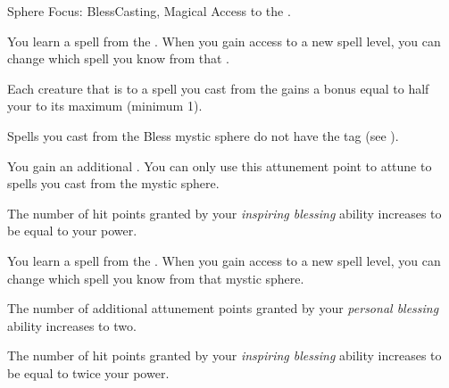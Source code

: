     \begin{feat}{Sphere Focus: Bless}{Casting, Magical}
        \featpre Access to the  .

         You learn a spell from the  .
        When you gain access to a new spell level, you can change which spell you know from that .

         Each creature that is  to a spell you cast from the   gains a bonus equal to half your  to its maximum  (minimum 1).

         Spells you cast from the Bless mystic sphere do not have the  tag (see ).

         You gain an additional .
        You can only use this attunement point to attune to spells you cast from the  mystic sphere.

         The number of hit points granted by your \textit{inspiring blessing} ability increases to be equal to your power.

         You learn a spell from the  .
        When you gain access to a new spell level, you can change which spell you know from that mystic sphere.

         The number of additional attunement points granted by your \textit{personal blessing} ability increases to two.

         The number of hit points granted by your \textit{inspiring blessing} ability increases to be equal to twice your power.
    \end{feat}

